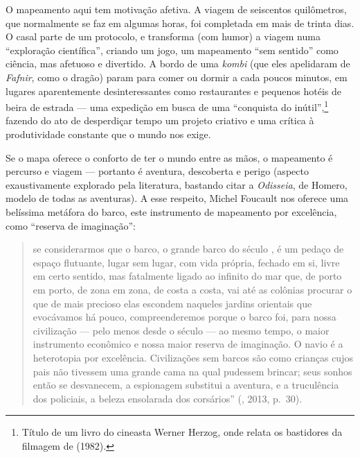 O mapeamento aqui tem motivação afetiva. A viagem de seiscentos
quilômetros, que normalmente se faz em algumas horas, foi completada em
mais de trinta dias. O casal parte de um protocolo, e transforma (com
humor) a viagem numa ``exploração científica'', criando um jogo, um
mapeamento ``sem sentido'' como ciência, mas afetuoso e divertido. A \label{travessia}
bordo de uma \emph{kombi} (que eles apelidaram de \emph{Fafnir}, como o
dragão) param para comer ou dormir a cada poucos minutos, em lugares
aparentemente desinteressantes como restaurantes e pequenos hotéis de
beira de estrada --- uma expedição em busca de uma ``conquista do
inútil'',\footnote{Título de um livro do cineasta Werner Herzog, onde
  relata os bastidores da filmagem de {} (1982).}
fazendo do ato de desperdiçar tempo um projeto criativo e uma crítica à
produtividade constante que o mundo nos exige.

Se o mapa oferece o conforto de ter o mundo entre as mãos, o mapeamento
é percurso e viagem --- portanto é aventura, descoberta e perigo (aspecto
exaustivamente explorado pela literatura, bastando citar a \emph{Odisseia}, de
Homero, modelo de todas as aventuras). A esse respeito, Michel Foucault
nos oferece uma belíssima metáfora do barco, este instrumento de
mapeamento por excelência, como ``reserva de imaginação'':

\begin{quote}
se considerarmos que o barco, o grande barco do século , é um pedaço
de espaço flutuante, lugar sem lugar, com vida própria, fechado em si,
livre em certo sentido, mas fatalmente ligado ao infinito do mar que, de
porto em porto, de zona em zona, de costa a costa, vai até as colônias
procurar o que de mais precioso elas escondem naqueles jardins orientais
que evocávamos há pouco, compreenderemos porque o barco foi, para nossa
civilização --- pelo menos desde o século  --- ao mesmo tempo, o maior
instrumento econômico e nossa maior reserva de imaginação. O navio é a
heterotopia por excelência. Civilizações sem barcos são como crianças
cujos pais não tivessem uma grande cama na qual pudessem brincar; seus
sonhos então se desvanecem, a espionagem substitui a aventura, e a
truculência dos policiais, a beleza ensolarada dos corsários''
(, 2013, p.~30).
\end{quote}

